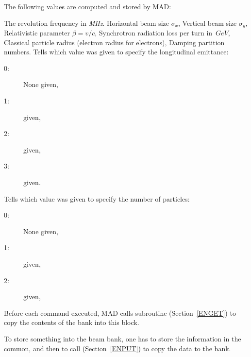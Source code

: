 The following values are computed and stored by MAD:
\begin{mylist}
The revolution frequency in {\sl MHz}.
Horizontal beam size $\sigma_x$,
Vertical beam size $\sigma_y$,
Relativistic parameter $\beta = v / c$,
Synchrotron radiation loss per turn in~$GeV$,
Classical particle radius (electron radius for electrons),
Damping partition numbers.
Tells which value was given to specify the longitudinal emittance:
\begin{description}
\item[0:] None given,
\item[1:]  given,
\item[2:]  given,
\item[3:]  given.
\end{description}
Tells which value was given to specify the number of particles:
\begin{description}
\item[0:] None given,
\item[1:]  given,
\item[2:]  given,
\end{description}
\end{mylist}
Before each command executed, MAD calls subroutine 
(Section~\ref{ENGET})
to copy the contents of the  bank into this block.
 
To store something into the beam bank,
one has to store the information in the  common,
and then to call  (Section~\ref{ENPUT}) to copy the data
to the  bank.
 
